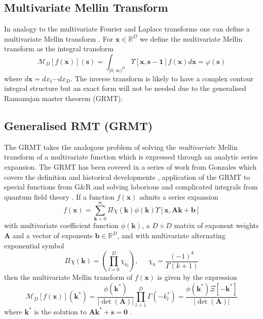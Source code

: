 \documentclass[journal=jcisd8,manuscript=article,layout=onecolumn,pdftex,floatfix,amsmath,amssymb,10pt]{achemso}
\begin{document}
\subsection{Multivariate Mellin Transform}
In analogy to the multivariate Fourier and Laplace transforms one can define a multivariate Mellin transform \cite{Laplace, Fourier, Mellin, Multivaraite Mellin}. For $\mathbf{x} \in \mathbb{R}^D$ we define the multivariate Mellin transform as the integral transform
\begin{equation}
\mathcal{M}_D[f(\mathbf{x})](\mathbf{s}) = \int_{[0,\infty)^D} \Upsilon[\mathbf{x},\mathbf{s-1}] f(\mathbf{x}) d \mathbf{x} = \varphi(\mathbf{s})
\end{equation}
where $d\mathbf{x} = dx_1 \cdots dx_D$. The inverse transform is likely to have a complex contour integral structure but an exact form will not be needed due to the generalised Ramanujan master theorem (GRMT).

\subsection{Generalised RMT (GRMT)}
The GRMT takes the analogous problem of solving the \emph{multivariate} Mellin transform of a multivariate function which is expressed through an analytic series expansion. The GRMT has been covered in a series of work from {\color{red}Gonzales} which covers the definition and historical developments \cite{}, application of the GRMT to special functions from G\&R \cite{...,..,...} and solving laborious and complicated integrals from quantum field theory \cite{}. If a function $f(\mathbf{x})$ admits a series expansion \begin{equation}
f(\mathbf{x}) = \sum_{\mathbf{k}=0}^\infty \Pi\chi(\mathbf{k}) \phi(\mathbf{k}) \Upsilon[\mathbf{x},\mathbf{A}\mathbf{k} + \mathbf{b}]
\end{equation}
with multivariate coefficient function $\phi(\mathbf{k})$, a $D\times D$ matrix of exponent weights $\mathbf{A}$ and a vector of exponents $\mathbf{b} \in \mathbb{R}^D$, and with multivariate alternating exponential symbol
\begin{equation}
\Pi\chi(\mathbf{k}) = \left(\prod_{l=0}^D \chi_{k_l}\right),\;\;\;\;\; \chi_k = \frac{(-1)^k}{\Gamma(k+1)}
\end{equation}
then the multivariate Mellin transform of $f(\mathbf{x})$ is given by the expression \begin{equation}
\mathcal{M}_D[f(\mathbf{x})](\mathbf{k}^*) = \frac{\phi(\mathbf{k}^*)}{|\det(\mathbf{A})|} \prod_{l=1}^D \Gamma(-k_l^*) = \frac{\phi(\mathbf{k}^*)\Xi[-\mathbf{k}^*]}{|\det(\mathbf{A})|}
\end{equation}
where $\mathbf{k}^*$ is the solution to $\mathbf{A}\mathbf{k^*}+\mathbf{s}=\mathbf{0}$ \cite{}.
\end{document}
